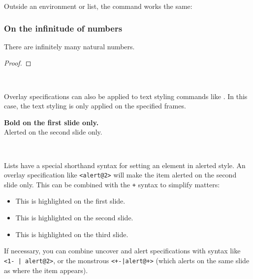 Outside an environment or list, the  command works the same:
%
\begin{ExampleCode}
\begin{frame}
\frametitle{On the infinitude of numbers}

\begin{corollary}
There are infinitely many natural numbers.
\end{corollary}
\begin{proof}
\end{proof}

\end{frame}
\end{ExampleCode}
%
\begin{center}
~
~
\end{center}

Overlay specifications can also be applied to text styling commands like .
In this case, the text styling is only applied on the specified frames.
%
\begin{ExampleCode}
\begin{frame}

\textbf<1>{Bold on the first slide only.}\\
\alert<2>{Alerted on the second slide only.}

\end{frame}
\end{ExampleCode}
%
\begin{center}
~
\end{center}

Lists have a special shorthand syntax for setting an element in alerted style.
An overlay specification like \verb|<alert@2>| will make the item alerted on the second slide only.
This can be combined with the \verb|+| syntax to simplify matters:
%
\begin{ExampleCode}
\begin{itemize} %
    \item<alert@+> This is highlighted on the first slide.
    \item<alert@+> This is highlighted on the second slide.
    \item<alert@+> This is highlighted on the third slide.
\end{itemize}
\end{ExampleCode}
%
If necessary, you can combine uncover and alert specifications with syntax like \verb+<1- | alert@2>+,
or the monstrous \verb&<+-|alert@+>& (which alerts on the same slide as where the item appears).

